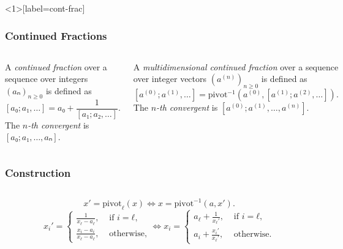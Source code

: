 \documentclass[aspectratio=169]{beamer}
\begin{document}
\begin{frame}<1>[label={cont-frac}]
  \frametitle{Continued Fractions}
  \small
  \begin{columns}[T]
    \begin{definition}
      A \emph{continued fraction} over a sequence over integers $(aₙ)_{n≥0}$ is defined as
      \[
        [a₀; a₁, …] = a₀ + \frac{1}{[a₁; a₂, …]}.
      \]
      The \emph{$n$-th convergent} is $[a₀; a₁, …, aₙ]$.
    \end{definition}

    \pause
    \begin{definition}
      A \emph{multidimensional continued fraction} over a sequence over integer
      vectors $(a^{(n)})_{n≥0}$ is defined as
      \[
        [a^{(0)}; a^{(1)}, …] = \mathrm{pivot}^{-1}(a^{(0)}, [a^{(1)}; a^{(2)}, …]).
      \]
      The \emph{$n$-th convergent} is $[a^{(0)}; a^{(1)}, …, a^{(n)}]$.
    \end{definition}
  \end{columns}
\end{frame}

\begin{frame}
  \frametitle{Construction}

  \begin{columns}

  \end{columns}
\end{frame}

\begin{frame}
  \[
    x' = \mathrm{pivot}_ℓ(x)
    \iff
    x = \mathrm{pivot}^{-1}(a, x').
  \]
  \[
    x_i' =
    \begin{cases}
      \frac{1}{x_ℓ - a_ℓ}, & \text{ if } i = ℓ, \\
      \frac{x_i - a_i}{x_ℓ - a_ℓ}, & \text{ otherwise},
    \end{cases}
    \iff
    x_i =
    \begin{cases}
      a_ℓ + \frac{1}{x_ℓ'}, & \text{ if } i = ℓ, \\
      a_i + \frac{x_i'}{x_ℓ'}, & \text{ otherwise}.
    \end{cases}
  \]
\end{frame}
\end{document}
